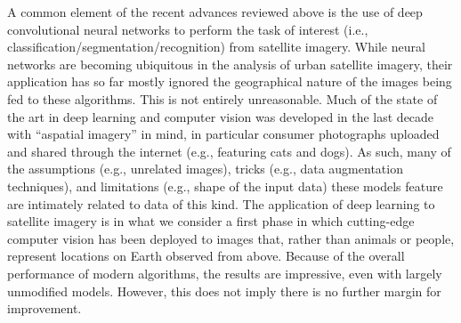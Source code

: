 

A common element of the recent advances reviewed above is the use of deep convolutional
neural networks to perform the task of interest (i.e.,
classification/segmentation/recognition) from satellite imagery. While neural networks
are becoming ubiquitous in the analysis of urban satellite imagery, their application has
so far mostly ignored the geographical nature of the images being fed to these
algorithms. This is not entirely unreasonable. Much of the state of the art in deep
learning and computer vision was developed in the last decade with ``aspatial imagery''
in mind, in particular consumer photographs uploaded and shared through the internet
(e.g., featuring cats and dogs). As such, many of the assumptions (e.g., unrelated
images), tricks (e.g., data augmentation techniques), and limitations (e.g., shape of
the input data) these models feature are intimately related to data of this kind. The
application of deep learning to satellite imagery is in what we consider a first phase
in which cutting-edge computer vision has been deployed to images that, rather than
animals or people, represent locations on Earth observed from above. Because of the
overall performance of modern algorithms, the results are impressive, even
with largely unmodified models. However, this does not imply there is no further margin
for improvement.

